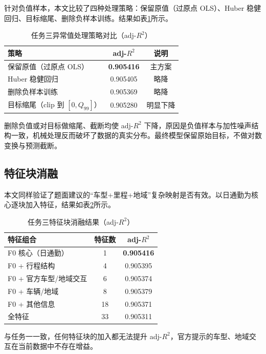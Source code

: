 针对负值样本，本文比较了四种处理策略：保留原值（过原点 OLS）、Huber 稳健回归、目标缩尾、删除负样本训练。结果如表\ref{tab:t3_outlier}所示。

\begin{table}[H]
\centering
\caption{任务三异常值处理策略对比（adj-$R^2$）}
\label{tab:t3_outlier}
\begin{tabular}{lcc}
\toprule
\textbf{策略} & \textbf{adj-$R^2$} & \textbf{说明} \\
\midrule
保留原值（过原点 OLS） & \textbf{0.905416} & 主方案 \\
Huber 稳健回归 & 0.905405 & 略降 \\
删除负样本训练 & 0.905369 & 略降 \\
目标缩尾（clip 到 $[0, Q_{99}]$） & 0.905280 & 明显下降 \\
\bottomrule
\end{tabular}
\end{table}

删除负值或对目标做缩尾、截断均使 adj-$R^2$ 下降，原因是负值样本与加性噪声结构一致，机械处理反而破坏了数据的真实分布。最终模型保留原始目标，不做对数变换与预测截断。

\subsection{特征块消融}

本文同样验证了题面建议的``车型+里程+地域''复杂映射是否有效。以日通勤为核心逐块加入特征，结果如表\ref{tab:t3_ablation}所示。

\begin{table}[H]
\centering
\caption{任务三特征块消融结果（adj-$R^2$）}
\label{tab:t3_ablation}
\begin{tabular}{lcc}
\toprule
\textbf{特征组合} & \textbf{特征数} & \textbf{adj-$R^2$} \\
\midrule
F0 核心（日通勤） & 1 & \textbf{0.905416} \\
F0 + 行程结构 & 4 & 0.905395 \\
F0 + 官方车型/地域交互 & 6 & 0.905374 \\
F0 + 车辆/地域 & 8 & 0.905379 \\
F0 + 其他信息 & 18 & 0.905371 \\
全特征 & 33 & 0.905311 \\
\bottomrule
\end{tabular}
\end{table}

与任务一一致，任何特征块的加入都无法提升 adj-$R^2$，官方提示的车型、地域交互在当前数据中不存在增益。

